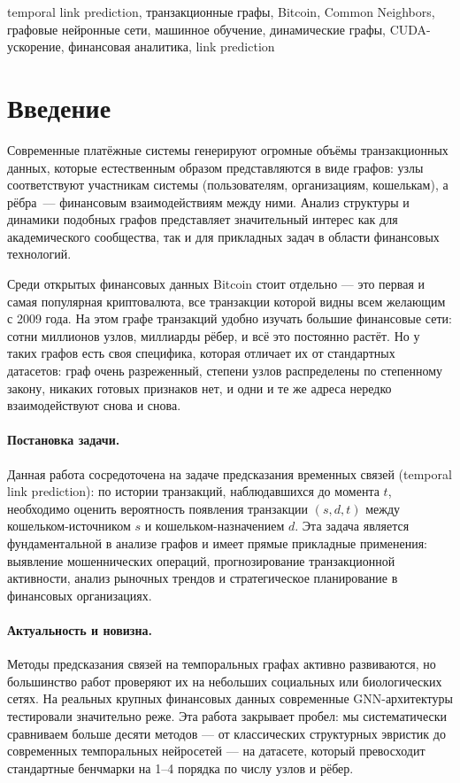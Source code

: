 \documentclass[a4paper,12pt]{extarticle}
\begin{document}

temporal link prediction, транзакционные графы, Bitcoin, Common Neighbors, графовые нейронные сети, машинное обучение, динамические графы, CUDA-ускорение, финансовая аналитика, link prediction

\newpage

\section*{Введение}


Современные платёжные системы генерируют огромные объёмы транзакционных данных, которые естественным образом представляются в виде графов: узлы соответствуют участникам системы (пользователям, организациям, кошелькам), а рёбра~--- финансовым взаимодействиям между ними. Анализ структуры и динамики подобных графов представляет значительный интерес как для академического сообщества, так и для прикладных задач в области финансовых технологий.

Среди открытых финансовых данных Bitcoin стоит отдельно — это первая и самая популярная криптовалюта, все транзакции которой видны всем желающим с 2009 года. На этом графе транзакций удобно изучать большие финансовые сети: сотни миллионов узлов, миллиарды рёбер, и всё это постоянно растёт. Но у таких графов есть своя специфика, которая отличает их от стандартных датасетов: граф очень разреженный, степени узлов распределены по степенному закону, никаких готовых признаков нет, и одни и те же адреса нередко взаимодействуют снова и снова.

\paragraph{Постановка задачи.}
Данная работа сосредоточена на задаче предсказания временных связей (temporal link prediction): по истории транзакций, наблюдавшихся до момента $t$, необходимо оценить вероятность появления транзакции $(s, d, t)$ между кошельком-источником $s$ и кошельком-назначением $d$. Эта задача является фундаментальной в анализе графов и имеет прямые прикладные применения: выявление мошеннических операций, прогнозирование транзакционной активности, анализ рыночных трендов и стратегическое планирование в финансовых организациях.

\paragraph{Актуальность и новизна.}
Методы предсказания связей на темпоральных графах активно развиваются, но большинство работ проверяют их на небольших социальных или биологических сетях. На реальных крупных финансовых данных современные GNN-архитектуры тестировали значительно реже. Эта работа закрывает пробел: мы систематически сравниваем больше десяти методов — от классических структурных эвристик до современных темпоральных нейросетей — на датасете, который превосходит стандартные бенчмарки на 1–4 порядка по числу узлов и рёбер.
\end{document}
